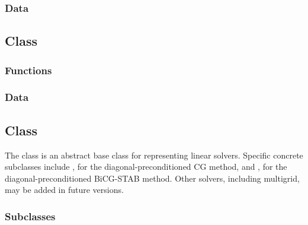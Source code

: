 \documentclass[11pt]{article}
\begin{document}
\subsubsection{ Data}

\subsection{ Class} \label{ss:discret}

\subsubsection{ Functions}
\subsubsection{ Data}

\subsection{ Class} \label{ss:solver}

   The  class is an abstract base class for representing linear
   solvers.  Specific concrete subclasses include , for the
   diagonal-preconditioned CG method, and , for the
   diagonal-preconditioned BiCG-STAB method.  Other solvers, including
   multigrid, may be added in future versions.

\subsubsection{ Subclasses}
\end{document}
